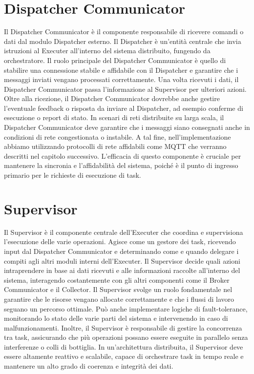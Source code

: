 \documentclass[target=bach,aauheader=,style=]{thud}
\begin{document}
\section{Dispatcher Communicator}
Il Dispatcher Communicator è il componente responsabile di ricevere comandi o dati dal modulo Dispatcher esterno. Il Dispatcher è un'entità centrale che invia istruzioni al Executer all'interno del sistema distribuito, fungendo da orchestratore. Il ruolo principale del Dispatcher Communicator è quello di stabilire una connessione stabile e affidabile con il Dispatcher e garantire che i messaggi inviati vengano processati correttamente. Una volta ricevuti i dati, il Dispatcher Communicator passa l'informazione al Supervisor per ulteriori azioni.
Oltre alla ricezione, il Dispatcher Communicator dovrebbe anche gestire l'eventuale feedback o risposta da inviare al Dispatcher, ad esempio conferme di esecuzione o report di stato. In scenari di reti distribuite su larga scala, il Dispatcher Communicator deve garantire che i messaggi siano consegnati anche in condizioni di rete congestionata o instabile. A tal fine, nell'implementazione  abbiamo utilizzando protocolli di rete affidabili come MQTT che verranno descritti nel capitolo successivo. L'efficacia di questo componente è cruciale per mantenere la sincronia e l'affidabilità del sistema, poiché è il punto di ingresso primario per le richieste di esecuzione di task.


\section{Supervisor}
Il Supervisor è il componente centrale dell'Executer che coordina e supervisiona l'esecuzione delle varie operazioni. Agisce come un gestore dei task, ricevendo input dal Dispatcher Communicator e determinando come e quando delegare i compiti agli altri moduli interni dell'Executer. Il Supervisor decide quali azioni intraprendere in base ai dati ricevuti e alle informazioni raccolte all'interno del sistema, interagendo costantemente con gli altri componenti come il Broker Communicator e il Collector.
Il Supervisor svolge un ruolo fondamentale nel garantire che le risorse vengano allocate correttamente e che i flussi di lavoro seguano un percorso ottimale. Può anche implementare logiche di fault-tolerance, monitorando lo stato delle varie parti del sistema e intervenendo in caso di malfunzionamenti. Inoltre, il Supervisor è responsabile di gestire la concorrenza tra task, assicurando che più operazioni possano essere eseguite in parallelo senza interferenze o colli di bottiglia. In un'architettura distribuita, il Supervisor deve essere altamente reattivo e scalabile, capace di orchestrare task in tempo reale e mantenere un alto grado di coerenza e integrità dei dati.
\end{document}
